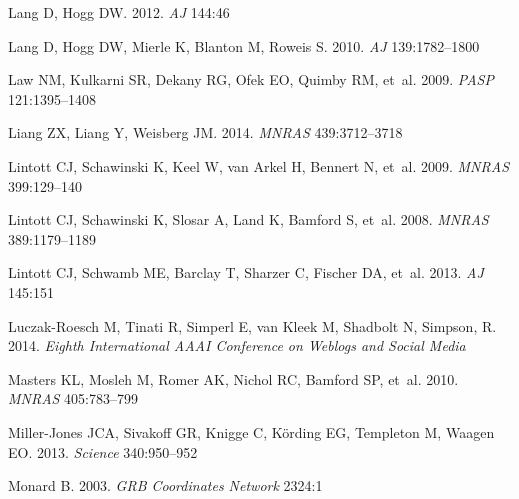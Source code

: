 \documentclass{ar2e}
\def\mnras{MNRAS}
\def\aj{AJ}
\def\pasp{PASP}
\begin{document}
\begin{thebibliography}{}
{Lang} D, {Hogg} DW. 2012.
\newblock \textit{\aj} 144:46

{Lang} D, {Hogg} DW, {Mierle} K, {Blanton} M, {Roweis} S. 2010.
\newblock \textit{\aj} 139:1782--1800

{Law} NM, {Kulkarni} SR, {Dekany} RG, {Ofek} EO, {Quimby} RM, et~al. 2009.
\newblock \textit{\pasp} 121:1395--1408

{Liang} ZX, {Liang} Y, {Weisberg} JM. 2014.
\newblock \textit{\mnras} 439:3712--3718

{Lintott} CJ, {Schawinski} K, {Keel} W, {van Arkel} H, {Bennert} N, et~al.
  2009.
\newblock \textit{\mnras} 399:129--140

{Lintott} CJ, {Schawinski} K, {Slosar} A, {Land} K, {Bamford} S, et~al. 2008.
\newblock \textit{\mnras} 389:1179--1189

{Lintott} CJ, {Schwamb} ME, {Barclay} T, {Sharzer} C, {Fischer} DA, et~al.
  2013.
\newblock \textit{\aj} 145:151

{Luczak-Roesch} M, {Tinati} R, {Simperl} E, {van Kleek} M, {Shadbolt} N, {Simpson}, R.
  2014.
\newblock \textit{Eighth International AAAI Conference on Weblogs and Social Media}

{Masters} KL, {Mosleh} M, {Romer} AK, {Nichol} RC, {Bamford} SP, et~al. 2010.
\newblock \textit{\mnras} 405:783--799

{Miller-Jones} JCA, {Sivakoff} GR, {Knigge} C, {K{\"o}rding} EG, {Templeton} M,
  {Waagen} EO. 2013.
\newblock \textit{Science} 340:950--952

{Monard} B. 2003.
\newblock \textit{GRB Coordinates Network} 2324:1


\end{thebibliography}
\end{document}

